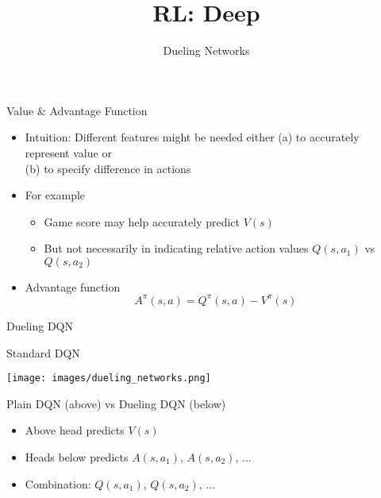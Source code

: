 \documentclass[aspectratio=169]{../latex_main/tntbeamer}  %
\title[RL: Deep Reinforcement Learning]{RL: Deep}
\subtitle{Dueling Networks}
\begin{document}
	
	\maketitle

\begin{frame}[c]{Value \& Advantage Function}
	

\begin{itemize}
	\item Intuition: Different features might be needed either (a) to accurately represent value or\\ (b) to specify difference in actions
	\item For example
	\begin{itemize}
		\item Game score may help accurately predict $V(s)$
		\item But not necessarily in indicating relative action values $Q(s,a_1)$ vs $Q(s,a_2)$
	\end{itemize}
	\item Advantage function \\
	$$A^\pi (s,a) = Q^\pi(s,a) - V^\pi(s) $$
\end{itemize}
	
\end{frame}
\begin{frame}[c]{Dueling DQN~}

\begin{center}
Standard DQN

\vspace{-2em}
\texttt{[image: images/dueling\_networks.png]}

Plain DQN (above) vs Dueling DQN (below)
\end{center}

\begin{itemize}
	\item Above head predicts $V(s)$
	\item Heads below predicts $A(s,a_1)$, $A(s,a_2)$, $\ldots$
	\item Combination: $Q(s,a_1)$, $Q(s,a_2)$, $\ldots$
\end{itemize}
	
\end{frame}
\end{document}
